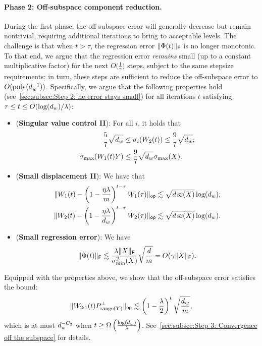 \paragraph{Phase 2: Off-subspace component reduction.}
During the first phase, the off-subspace error will generally
decrease but remain nontrivial, requiring additional iterations to bring to acceptable levels.
The challenge is that when $t > \tau$, the regression error $\lVert\Phi(t)\rVert_{\mathsf{F}}$ is no longer monotonic.
To that end, we argue that the regression error \emph{remains} small
(up to a constant multiplicative factor) for the next $O\big(\frac{1}{\gamma}\big)$ steps,
subject to the same stepsize requirements; in turn, these steps are sufficient to reduce
the off-subspace error to $O(\mathrm{poly}(d_{w}^{-1}))$.
Specifically, we argue that the following properties
hold (see~\cref{sec:subsec:Step 2: he error stays small}) for all iterations $t$ satisfying $\tau \le t \le O(\log(d_{w}) / \lambda)$:
\begin{itemize}
	\item (\textbf{Singular value control II}): For all $i$, it holds that
	      \begin{align*}
		      \frac{5}{7} \sqrt{d_{w}}  & \leq \sigma_{i}(W_{2}(t)) \leq \frac{9}{7} \sqrt{d_{w}}; \\
		      \sigma_{\max}(W_{1}(t) Y) & \leq \frac{9}{7} \sqrt{d_{w}} \sigma_{\max}(X).
	      \end{align*}
	\item (\textbf{Small displacement II}): We have that
	      \begin{align*}
		      \lVert W_{1}(t) - \left(1 - \frac{\eta \lambda}{m}\right)^{t - \tau} W_{1}(\tau)\rVert_{\mathsf{op}}  & \lesssim \sqrt{d \operatorname{\mathrm{sr}}(X)} \log(d_{w}); \\
		      \lVert W_{2}(t) - \left(1 - \frac{\eta \lambda}{d_{w}}\right)^{t - \tau} W_{2}(\tau)\rVert_{\mathsf{op}} & \lesssim \sqrt{d \operatorname{\mathrm{sr}}(X)} \log(d_{w}).
	      \end{align*}
	\item (\textbf{Small regression error}): We have
	      \begin{equation*}
		      \lVert\Phi(t)\rVert_{\mathsf{F}} \lesssim
		      \frac{\lambda \lVert X\rVert_{\mathsf{F}}}{\sigma_{\min}^2(X)} \sqrt{\frac{d}{m}}
		      = O(\gamma \lVert X\rVert_{\mathsf{F}}).
	      \end{equation*}
\end{itemize}
Equipped with the properties above, we show that the off-subspace error
satisfies the bound:
\begin{equation}
	\lVert W_{2:1}(t) P_{\mathrm{range}(Y)}^{\perp}\rVert_{\mathsf{op}} \lesssim \left(1 - \frac{\lambda}{2}\right)^{t}
	\sqrt{\frac{d_{w}}{m}},
	\label{eq:proof-sketch-off-subspace-bound}
\end{equation}
which is at most $d_{w}^{-C_2}$ when
$t \geq \Omega\left(\frac{\log(d_{w})}{\lambda}\right)$.
See~\cref{sec:subsec:Step 3: Convergence off the subspace} for details.
